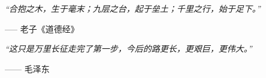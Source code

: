 \setlength{}
\setlength\epigraphrule{0pt}

\thispagestyle{empty}

\begin{center}
\epigraph{\itshape ``合抱之木，生于毫末；九层之台，起于垒土；千里之行，始于足下。''}{----- 老子《道德经》}
\epigraph{\itshape ``这只是万里长征走完了第一步，今后的路更长，更艰巨，更伟大。''}{------ 毛泽东}
\end{center}

\setlength{\abovedisplayskip}{-5pt}
\setlength{\abovedisplayshortskip}{-5pt}
